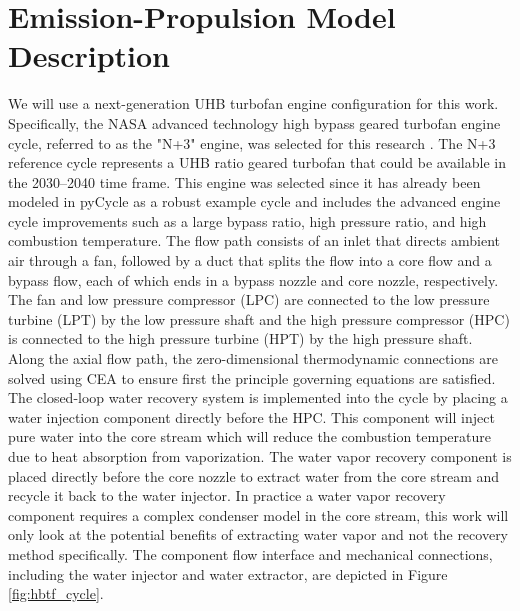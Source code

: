 \documentclass[conf]{new-aiaa}
\begin{document}
\section{Emission-Propulsion Model Description}
\label{sec:epModel}
We will use a next-generation UHB turbofan engine configuration for this work.
Specifically, the NASA advanced technology high bypass geared turbofan engine cycle, referred to as the "N+3" engine, was selected for this research \cite{Jones2017a}.
The N+3 reference cycle represents a UHB ratio geared turbofan that could be available in the 2030–2040 time frame.
This engine was selected since it has already been modeled in pyCycle as a robust example cycle and includes the advanced engine cycle improvements such as a large bypass ratio, high pressure ratio, and high combustion temperature.
The flow path consists of an inlet that directs ambient air through a fan, followed by a duct that splits the flow into a core flow and a bypass flow, each of which ends in a bypass nozzle and core nozzle, respectively.
The fan and low pressure compressor (LPC) are connected to the low pressure turbine (LPT) by the low pressure shaft and the high pressure compressor (HPC) is connected to the high pressure turbine (HPT) by the high pressure shaft.
Along the axial flow path, the zero-dimensional thermodynamic connections are solved using CEA to ensure first the principle governing equations are satisfied.
The closed-loop water recovery system is implemented into the cycle by placing a water injection component directly before the HPC.
This component will inject pure water into the core stream which will reduce the combustion temperature due to heat absorption from vaporization.
The water vapor recovery component is placed directly before the core nozzle to extract water from the core stream and recycle it back to the water injector.
In practice a water vapor recovery component requires a complex condenser model in the core stream, this work will only look at the potential benefits of extracting water vapor and not the recovery method specifically.
The component flow interface and mechanical connections, including the water injector and water extractor, are depicted in Figure \ref{fig:hbtf_cycle}.
\end{document}
